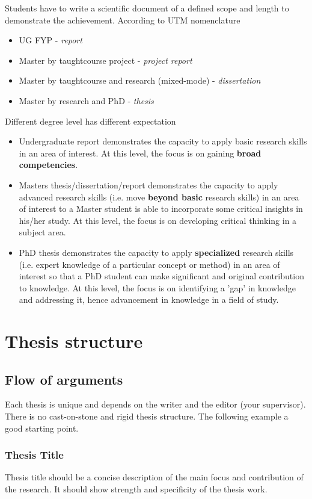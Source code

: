 \documentclass{utmthesis}
\begin{document}
Students have to write a scientific document of a defined scope and
length to demonstrate the achievement. According to UTM nomenclature
\begin{itemize}
\item UG FYP - \emph{report}
\item Master by taughtcourse project - \emph{project report}
\item Master by taughtcourse and research (mixed-mode) - \emph{dissertation}
\item Master by research and PhD - \emph{thesis}
\end{itemize}

Different degree level has different expectation
\begin{itemize}
\item Undergraduate report demonstrates the capacity to apply basic research
skills in an area of interest. At this level, the focus is on gaining
\textbf{broad competencies}. 
\item Masters thesis/dissertation/report demonstrates the capacity to apply
advanced research skills (i.e. move \textbf{beyond basic} research
skills) in an area of interest to a Master student is able to incorporate
some critical insights in his/her study. At this level, the focus
is on developing critical thinking in a subject area.
\item PhD thesis demonstrates the capacity to apply \textbf{specialized}
research skills (i.e. expert knowledge of a particular concept or
method) in an area of interest so that a PhD student can make significant
and original contribution to knowledge. At this level, the focus is
on identifying a 'gap' in knowledge and addressing it, hence advancement
in knowledge in a field of study.
\end{itemize}


\chapter{Thesis structure}

\section{Flow of arguments}
Each thesis is unique and depends on the writer and the editor (your
supervisor). There is no cast-on-stone and rigid thesis structure.
The following example a good starting point.

\subsection{Thesis Title}
Thesis title should be a concise description of the main focus and
contribution of the research. It should show strength and specificity of the thesis work.
\end{document}
